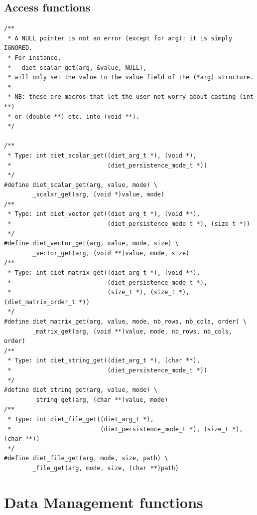 \subsection{Access functions}
\label{sec:accessfun}
{\footnotesize
\begin{verbatim}
/**
 * A NULL pointer is not an error (except for arg): it is simply IGNORED.
 * For instance,
 *   diet_scalar_get(arg, &value, NULL),
 * will only set the value to the value field of the (*arg) structure.
 * 
 * NB: these are macros that let the user not worry about casting (int **)
 * or (double **) etc. into (void **).
 */

/**
 * Type: int diet_scalar_get((diet_arg_t *), (void *),
 *                           (diet_persistence_mode_t *))
 */
#define diet_scalar_get(arg, value, mode) \
        _scalar_get(arg, (void *)value, mode)
/**
 * Type: int diet_vector_get((diet_arg_t *), (void **),
 *                           (diet_persistence_mode_t *), (size_t *))
 */
#define diet_vector_get(arg, value, mode, size) \
        _vector_get(arg, (void **)value, mode, size)
/**
 * Type: int diet_matrix_get((diet_arg_t *), (void **),
 *                           (diet_persistence_mode_t *),
 *                           (size_t *), (size_t *), (diet_matrix_order_t *))
 */
#define diet_matrix_get(arg, value, mode, nb_rows, nb_cols, order) \
        _matrix_get(arg, (void **)value, mode, nb_rows, nb_cols, order)
/**
 * Type: int diet_string_get((diet_arg_t *), (char **),
 *                           (diet_persistence_mode_t *))
 */
#define diet_string_get(arg, value, mode) \
        _string_get(arg, (char **)value, mode)
/**
 * Type: int diet_file_get((diet_arg_t *),
 *                         (diet_persistence_mode_t *), (size_t *), (char **))
 */
#define diet_file_get(arg, mode, size, path) \
        _file_get(arg, mode, size, (char **)path)
\end{verbatim}
}


\section{Data Management functions}


